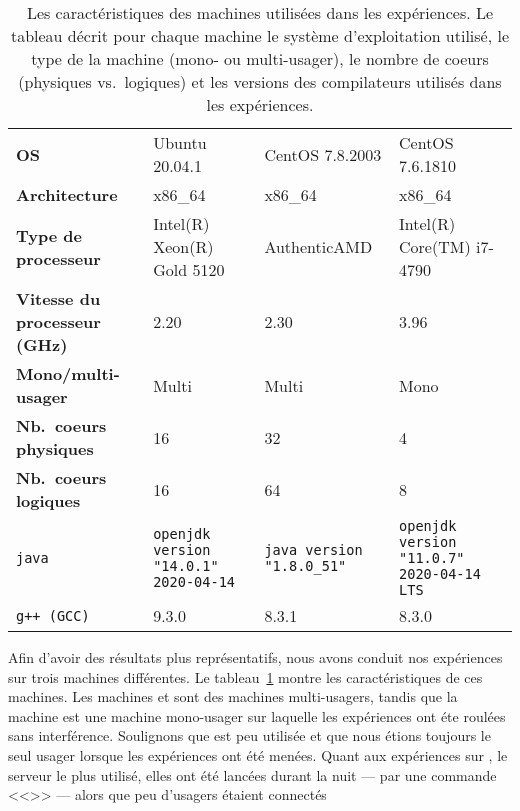 


\newcommand{\LARGEUR}{3cm}

\begin{table}
\begin{tabular}{|p{3cm}|p{\LARGEUR}|p{\LARGEUR}|p{\LARGEUR}|}
\hline
  & \M1 & \M2 & \M3
\\\hline
\textbf{OS} & Ubuntu 20.04.1 & CentOS 7.8.2003 & CentOS 7.6.1810
\\\hline
\textbf{Architecture} &  x86\_64 & x86\_64 & x86\_64
\\\hline
\textbf{Type de processeur} & Intel(R) Xeon(R) Gold 5120  & AuthenticAMD & Intel(R) Core(TM) i7-4790
\\\hline
\textbf{Vitesse du processeur (GHz)} & 2.20 & 2.30 & 3.96
\\\hline
\textbf{Mono/multi-usager} & Multi & Multi & Mono
\\\hline
\textbf{Nb.~coeurs physiques} & 16 & 32 & 4
\\\hline
\textbf{Nb.~coeurs logiques} & 16 & 64 & 8
\\\hline
\texttt{java}
  & \texttt{openjdk version "14.0.1" 2020-04-14}
  & \texttt{java version "1.8.0\_51"}
  & \texttt{openjdk version "11.0.7" 2020-04-14 LTS}
\\\hline
\texttt{g++ (GCC)}
   & 9.3.0
   & 8.3.1 
   & 8.3.0
\\\hline
\end{tabular}
\caption[Les caract\'eristiques des machines utilis\'ees dans les exp\'eriences.]{Les caract\'eristiques des machines utilis\'ees dans les exp\'eriences. Le tableau d\'ecrit pour chaque machine le syst\`eme d'exploitation utilis\'e, le type de la machine (mono- ou multi-usager), le nombre de coeurs (physiques vs.\ logiques) et les versions des compilateurs utilis\'es dans les exp\'eriences.}
\label{machines.table}
\end{table}


Afin d'avoir des r\'esultats plus représentatifs, nous avons conduit nos exp\'eriences sur trois machines diff\'erentes. Le tableau~\ref{machines.table} montre les caract\'eristiques de ces machines. Les machines  et  sont des machines multi-usagers, tandis que la machine  est une machine mono-usager sur laquelle les exp\'eriences ont \'et\/e roul\'ees sans interf\'erence.
%
Soulignons que  est peu utilisée et que nous étions toujours
le seul usager lorsque les expériences ont été menées. Quant aux
expériences sur , le serveur  le plus utilisé, elles
ont été lancées durant la nuit --- par une commande <<>> --- alors que peu d'usagers étaient connectés

